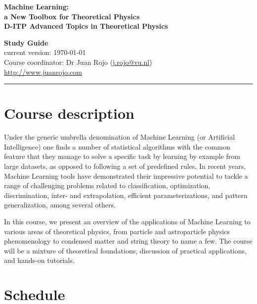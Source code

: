 \documentclass[12pt]{article}
\numberwithin{equation}{section}
\begin{document}
\begin{spacing}{1.1}
\begin{figure}[h]
\begin{center}
\end{center}
\end{figure}


\begin{center}
  {\bf \Large  Machine Learning: \\[0.2cm]a New Toolbox for Theoretical Physics}\\[0.4cm]
   {\bf \large  D-ITP Advanced Topics in Theoretical Physics}\\[0.8cm]
  \end{center}

 
\begin{center}
  {\Large \bf Study Guide}\\[0.3cm]
  current version: \today \\[0.3cm]

  {\large  Course coordinator: Dr Juan Rojo (\href{mailto:j.rojo@vu.nl}{j.rojo@vu.nl}})\\[0.3cm]
  {\large \url{http://www.juanrojo.com}}
\end{center}



\vskip30pt
\hrule
\vskip20pt

\clearpage

\section{Course description}

Under the generic umbrella denomination of Machine Learning (or Artificial Intelligence) one finds a number of statistical algorithms with the common feature that they manage to solve a specific task by learning by example from large datasets, as opposed to following a set of predefined rules. In recent years, Machine Learning tools have demonstrated their impressive potential to tackle a range of challenging problems related to classification, optimization, discrimination, inter- and extrapolation, efficient parameterizations, and pattern generalization, among several others.

In this course, we present an overview of the applications of Machine Learning to various areas of theoretical physics, from particle and astroparticle physics phenomenology to condensed matter and string theory to name a few. The course will be a mixture of theoretical foundations, discussion of practical applications, and hands-on tutorials.

\section{Schedule}


\end{spacing}
\end{document}
